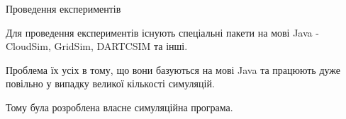 \begin{frame}{Проведення експериментів}
	\manimate
	
	Для проведення експериментів існують спеціальні пакети на мові Java - CloudSim, GridSim, DARTCSIM та інші.
	
	Проблема їх усіх в тому, що вони базуються на мові Java та працюють дуже повільно у випадку великої кількості симуляцій.
	
	Тому була розроблена власне симуляційна програма.
\end{frame}


